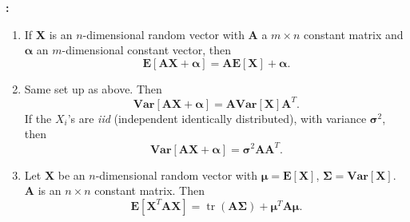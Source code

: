 \documentclass[12pt]{article}
\begin{document}
\textbf{:}
\begin{enumerate}
\item If \textbf{X} is an $n$-dimensional random vector with \textbf{A} a $m\times n$ constant matrix and $\boldsymbol{\alpha}$ an $m$-dimensional constant vector, then $$\mathbf{E}[\mathbf{AX}+\boldsymbol{\alpha}]=\mathbf{AE}[\mathbf{X}]+\boldsymbol{\alpha}.$$
\item Same set up as above.  Then $$\mathbf{Var}[\mathbf{AX}+\boldsymbol{\alpha}]=\mathbf{AVar}[\mathbf{X}]\mathbf{A}^T.$$  If the ${X_i}$'s are \emph{iid} (independent identically distributed), with variance $\boldsymbol{\sigma}^2$, then $$\mathbf{Var}[\mathbf{AX}+\boldsymbol{\alpha}]=\boldsymbol{\sigma}^2\mathbf{AA}^T.$$
\item Let $\mathbf{X}$ be an $n$-dimensional random vector with $\boldsymbol{\mu}=\mathbf{E[X]}$,
$\boldsymbol{\Sigma}=\mathbf{Var[X]}$.  $\mathbf{A}$ is an $n\times
n$ constant matrix.  Then
$$\mathbf{E}[\mathbf{X}^T\mathbf{AX}]=\operatorname{tr}(\mathbf{A}\boldsymbol{\Sigma})+
\boldsymbol{\mu}^T\mathbf{A}\boldsymbol{\mu}.$$
\end{enumerate}
\end{document}
